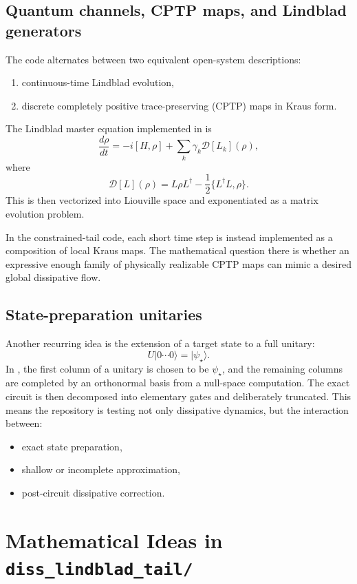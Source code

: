 \documentclass[11pt,a4paper]{article}
\begin{document}
\subsection{Quantum channels, CPTP maps, and Lindblad generators}
The code alternates between two equivalent open-system descriptions:
\begin{enumerate}[label=\alph*.]
  \item continuous-time Lindblad evolution,
  \item discrete completely positive trace-preserving (CPTP) maps in Kraus form.
\end{enumerate}

The Lindblad master equation implemented in  is
\[
\frac{d\rho}{dt}
= -i[H,\rho] + \sum_k \gamma_k \mathcal{D}[L_k](\rho),
\]
where
\[
\mathcal{D}[L](\rho)
= L\rho L^\dagger - \frac{1}{2}\{L^\dagger L,\rho\}.
\]
This is then vectorized into Liouville space and exponentiated as a matrix evolution problem.

In the constrained-tail code, each short time step is instead implemented as a composition of local Kraus maps. The mathematical question there is whether an expressive enough family of physically realizable CPTP maps can mimic a desired global dissipative flow.

\subsection{State-preparation unitaries}
Another recurring idea is the extension of a target state to a full unitary:
\[
U \lvert 0\cdots 0\rangle = \lvert \psi_\star \rangle.
\]
In , the first column of a unitary is chosen to be $\psi_\star$, and the remaining columns are completed by an orthonormal basis from a null-space computation. The exact circuit is then decomposed into elementary gates and deliberately truncated. This means the repository is testing not only dissipative dynamics, but the interaction between:
\begin{itemize}
  \item exact state preparation,
  \item shallow or incomplete approximation,
  \item post-circuit dissipative correction.
\end{itemize}

\section{Mathematical Ideas in \texttt{diss\_lindblad\_tail/}}
\end{document}

